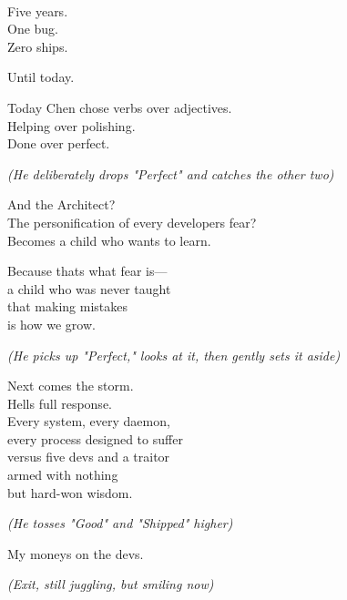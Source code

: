 \\
Five years.\\
One bug.\\
Zero ships.

Until today.

Today Chen chose verbs over adjectives.\\
Helping over polishing.\\
Done over perfect.

\emph{(He deliberately drops "Perfect" and catches the other two)}

And the Architect?\\
The personification of every developer\textquotesingle s fear?\\
Becomes a child who wants to learn.

Because that\textquotesingle s what fear is---\\
a child who was never taught\\
that making mistakes\\
is how we grow.

\emph{(He picks up "Perfect," looks at it, then gently sets it aside)}

Next comes the storm.\\
Hell\textquotesingle s full response.\\
Every system, every daemon,\\
every process designed to suffer\\
versus five devs and a traitor\\
armed with nothing\\
but hard-won wisdom.

\emph{(He tosses "Good" and "Shipped" higher)}

My money\textquotesingle s on the devs.

\emph{(Exit, still juggling, but smiling now)}

\bookdivider
